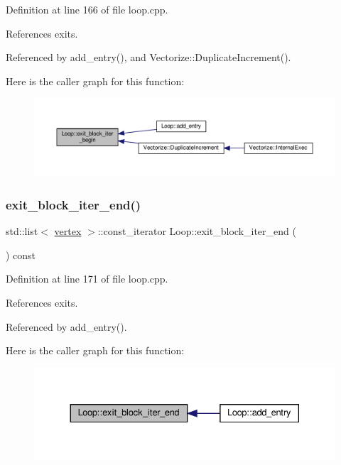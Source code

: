 Definition at line 166 of file loop.\+cpp.



References exits.



Referenced by add\+\_\+entry(), and Vectorize\+::\+Duplicate\+Increment().

Here is the caller graph for this function\+:
\nopagebreak
\begin{figure}[H]
\begin{center}
\leavevmode
\includegraphics[width=350pt]{de/d77/classLoop_ad472be2d5c670602f94e9bf7aba4e814_icgraph}
\end{center}
\end{figure}
\mbox{\label{classLoop_a73fe5bd00a5cb93a52e6dcb3bc85b03d}} 
\subsubsection{\texorpdfstring{exit\+\_\+block\+\_\+iter\+\_\+end()}{exit\_block\_iter\_end()}}
{\footnotesize\ttfamily std\+::list$<$ \hyperlink{graph_8hpp_abefdcf0544e601805af44eca032cca14}{vertex} $>$\+::const\+\_\+iterator Loop\+::exit\+\_\+block\+\_\+iter\+\_\+end (\begin{DoxyParamCaption}{ }\end{DoxyParamCaption}) const}



Definition at line 171 of file loop.\+cpp.



References exits.



Referenced by add\+\_\+entry().

Here is the caller graph for this function\+:
\nopagebreak
\begin{figure}[H]
\begin{center}
\leavevmode
\includegraphics[width=330pt]{de/d77/classLoop_a73fe5bd00a5cb93a52e6dcb3bc85b03d_icgraph}
\end{center}
\end{figure}
\mbox{\label{classLoop_a2d02ea941387f0fa9efde20f4a812070}} 
